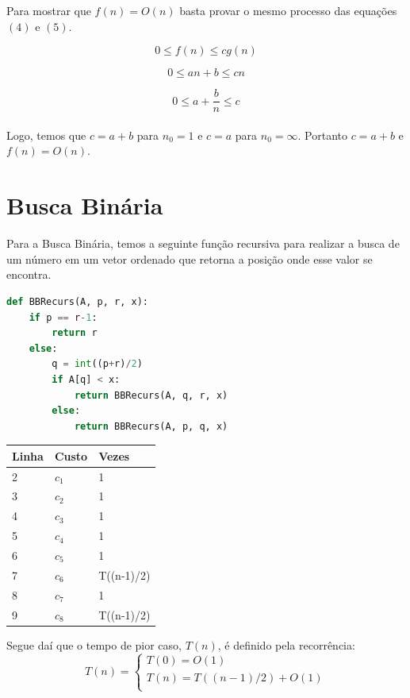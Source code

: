 \documentclass[a4paper, 12pt]{article}
\begin{document}
Para mostrar que $f(n)=O(n)$ basta provar o mesmo processo das equações $(4)$ e $(5)$.

\begin{equation}
0 \leq f(n) \leq cg(n)
\end{equation}

\begin{equation}
0 \leq an+b \leq cn
\end{equation}

\begin{equation}
0 \leq a+\frac{b}{n} \leq c
\end{equation}\\	

Logo, temos que $c=a+b$ para $n_0=1$ e $c=a$ para $n_0=\infty$. Portanto $c=a+b$ e $f(n) = O(n)$.

\section{Busca Binária}

Para a Busca Binária, temos a seguinte função recursiva para realizar a busca de um número em um vetor ordenado que retorna a posição onde esse valor se encontra.

\begin{lstlisting}[language=Python, caption= Código da função da Busca Binária]
def BBRecurs(A, p, r, x):
    if p == r-1:
	    return r
    else: 
        q = int((p+r)/2)
        if A[q] < x:
            return BBRecurs(A, q, r, x)
        else:
            return BBRecurs(A, p, q, x)
\end{lstlisting}

\begin{center}
\begin{tabular}{|l|l|l|}
\hline
{\bf Linha} & {\bf Custo} & {\bf Vezes}\\
\hline
2 & $c_1$ & 1\\
\hline
3 & $c_2$ & 1\\
\hline
4 & $c_3$ & 1\\
\hline
5 & $c_4$ & 1\\
\hline
6 & $c_5$ & 1\\
\hline
7 & $c_6$ & T((n-1)/2)\\
\hline
8 & $c_7$ & 1\\
\hline
9 & $c_8$ & T((n-1)/2)\\
\hline
\end{tabular}
\end{center}

Segue daí que o tempo de pior caso, $T(n)$, é definido pela recorrência:
\begin{equation}
T(n) = \left\{ \begin{array}{l}
T(0)=O(1) \\
T(n)=T((n-1)/2)+O(1)\\
\end{array}
\right.
\end{equation} \\
\end{document}

